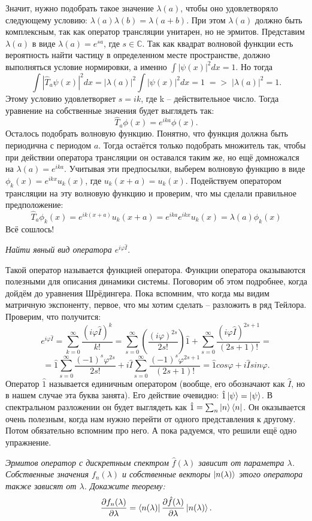 Значит, нужно подобрать такое значение $\lambda(a)$, чтобы оно удовлетворяло следующему условию: $\lambda(a)\lambda(b) = \lambda(a+b)$. При этом $\lambda(a)$ должно быть комплексным, так как оператор трансляции унитарен, но не эрмитов. Представим $\lambda(a)$ в виде $\lambda(a) = e^{sa}$, где $s\in \mathbb{C}$.
Так как квадрат волновой функции есть вероятность найти частицу в определенном месте пространстве, должно выполняться условие нормировки, а именно $\int |\psi(x)|^2 dx = 1$. Но тогда 
\[
\int |\hat{T}_a\psi(x)|^2 dx = |\lambda(a)|^2\int |\psi(x)|^2 dx = 1\; => \; |\lambda(a)|^2 = 1.
\]
Этому условию удовлетворяет $s = ik$, где k -- действительное число. Тогда уравнение на собственные значения будет выглядеть так:
\[
\hat{T}_{a}\phi(x) = e^{ika}\phi(x).
\]
Осталось подобрать волновую функцию. Понятно, что функция должна быть периодична с периодом $a$. Тогда остаётся только подобрать множитель так, чтобы при действии оператора трансляции он оставался таким же, но ещё домножался на $\lambda(a) = e^{ika}$. Учитывая эти предпосылки, выберем волновую функцию в виде $\phi_k(x) = e^{ikx}u_k(x)$, где $u_k(x + a) = u_k(x)$. Подействуем оператором трансляции на эту волновую функцию и проверим, что мы сделали правильное предположение:
\[
\hat T_a \phi_k(x) = e^{ik(x+a)}u_k(x+a) = e^{ika}e^{ikx}u_k(x) = \lambda(a) \phi_k(x)
\]
Всё сошлось!
\newpage
{}
\begin{center}
\textit{Найти явный вид оператора $e^{i\varphi\hat I}$}.
\end{center}
Такой оператор называется функцией оператора. Функции оператора оказываются полезными для описания динамики системы. Поговорим об этом подробнее, когда дойдём до уравнения Шрёдингера. Пока вспомним, что когда мы видим матричную экспоненту, первое, что мы хотим сделать -- разложить в ряд Тейлора. Проверим, что получится:
\[
e^{i\varphi\hat I} = \sum\limits_{k=0}^{\infty} \frac{(i\varphi\hat I)^k}{k!} = \sum\limits_{s=0}^{\infty} (\frac{(i\varphi)^{2s}}{2s!})\hat 1 + \sum\limits_{s=0}^{\infty} \frac{(i\varphi\hat I)^{2s+1}}{(2s+1)!} = 
\]
\[
=\hat 1 \sum\limits_{s=0}^{\infty} \frac{(-1)^s\varphi^{2s}}{2s!} + i\hat I \sum\limits_{s=0}^{\infty} \frac{(-1)^{s}\varphi^{2s+1}}{(2s+1)!} = \hat 1 cos\varphi + i\hat I sin \varphi.
\]
Оператор $\hat{1}$ называется единичным оператором (вообще, его обозначают как $\hat{I}$, но в нашем случае эта буква занята). Его действие очевидно: $\hat{1}\ket{\psi} = \ket{\psi}$. В спектральном разложении он будет выглядеть как $\hat{1} = \sum_n \ket{n}\bra{n}$. Он оказывается очень полезным, когда нам нужно перейти от одного представления к другому. Потом обязательно вспомним про него. А пока радуемся, что решили ещё одно упражнение.
\begin{center}
\textit{Эрмитов оператор с дискретным спектром $\hat f(\lambda)$ зависит от параметра $\lambda$. Собственные значения $f_n(\lambda)$ и собственные векторы $\ket{n(\lambda)}$ этого оператора также зависят от $\lambda$. Докажите теорему:}
\[
\frac{\partial f_n(\lambda)}{\partial \lambda} = \bra{n(\lambda)} \frac{\partial \hat f(\lambda)}{\partial \lambda} \ket{n(\lambda)}.
\]
\end{center}

